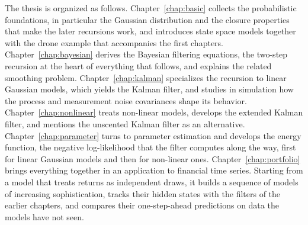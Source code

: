 The thesis is organized as follows. Chapter~\ref{chap:basic} collects the probabilistic foundations, in particular the Gaussian distribution and the closure properties that make the later recursions work, and introduces state space models together with the drone example that accompanies the first chapters. Chapter~\ref{chap:bayesian} derives the Bayesian filtering equations, the two-step recursion at the heart of everything that follows, and explains the related smoothing problem. Chapter~\ref{chap:kalman} specializes the recursion to linear Gaussian models, which yields the Kalman filter, and studies in simulation how the process and measurement noise covariances shape its behavior. Chapter~\ref{chap:nonlinear} treats non-linear models, develops the extended Kalman filter, and mentions the unscented Kalman filter as an alternative. Chapter~\ref{chap:parameter} turns to parameter estimation and develops the energy function, the negative log-likelihood that the filter computes along the way, first for linear Gaussian models and then for non-linear ones. Chapter~\ref{chap:portfolio} brings everything together in an application to financial time series. Starting from a model that treats returns as independent draws, it builds a sequence of models of increasing sophistication, tracks their hidden states with the filters of the earlier chapters, and compares their one-step-ahead predictions on data the models have not seen.
